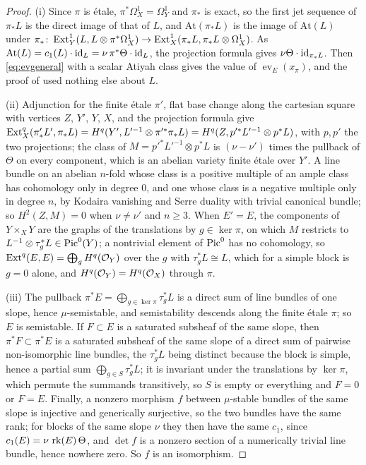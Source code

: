 \begin{proof}
(i) Since $\pi$ is \'etale, $\pi^{*}\Omega^{1}_{X}=\Omega^{1}_{Y}$ and $\pi_{*}$
is exact, so the first jet sequence of $\pi_{*}L$ is the direct image of
that of $L$, and $\mathrm{At}(\pi_{*}L)$ is the image of $\mathrm{At}(L)$
under $\pi_{*}\colon\operatorname{Ext}^{1}_{Y}(L,L\otimes\pi^{*}\Omega^{1}_{X})\to
\operatorname{Ext}^{1}_{X}(\pi_{*}L,\pi_{*}L\otimes\Omega^{1}_{X})$. As $\mathrm{At}(L)=c_{1}(L)\cdot\operatorname{id}_{L}
=\nu\,\pi^{*}\Theta\cdot\operatorname{id}_{L}$, the projection formula gives
$\nu\Theta\cdot\operatorname{id}_{\pi_{*}L}$. Then \eqref{eq:evgeneral} with a scalar Atiyah
class gives the value of $\operatorname{ev}_{E}(x_{\pi})$, and the proof of
 used nothing else about $L$.

(ii) Adjunction for the finite \'etale $\pi'$, flat base change along the
cartesian square with vertices $Z$, $Y'$, $Y$, $X$, and the projection formula
give $\operatorname{Ext}^{q}_{X}(\pi'_{*}L',\pi_{*}L)=H^{q}(Y',L'^{-1}\otimes\pi'^{*}\pi_{*}L)
=H^{q}(Z,p'^{*}L'^{-1}\otimes p^{*}L)$, with $p,p'$ the two projections; the
class of $M=p'^{*}L'^{-1}\otimes p^{*}L$ is $(\nu-\nu')$ times the pullback of
$\Theta$ on every component, which is an abelian variety finite \'etale over
$Y'$. A line bundle on an abelian $n$-fold whose class is a positive
multiple of an ample class has cohomology only in degree $0$, and one whose
class is a negative multiple only in degree $n$, by Kodaira vanishing and
Serre duality with trivial canonical bundle; so $H^{2}(Z,M)=0$ when
$\nu\ne\nu'$ and $n\ge3$. When $E'=E$, the components of $Y\times_{X}Y$ are
the graphs of the translations by $g\in\ker\pi$, on which $M$ restricts to
$L^{-1}\otimes\tau_{g}^{*}L\in\operatorname{Pic}^{0}(Y)$; a nontrivial element of $\operatorname{Pic}^{0}$
has no cohomology, so $\operatorname{Ext}^{q}(E,E)=\bigoplus_{g}H^{q}(\mathcal{O}_{Y})$ over the
$g$ with $\tau_{g}^{*}L\cong L$, which for a simple block is $g=0$ alone, and
$H^{q}(\mathcal{O}_{Y})=H^{q}(\mathcal{O}_{X})$ through $\pi$.

(iii) The pullback $\pi^{*}E=\bigoplus_{g\in\ker\pi}\tau_{g}^{*}L$ is a direct
sum of line bundles of one slope, hence $\mu$-semistable, and semistability
descends along the finite \'etale $\pi$; so $E$ is semistable. If $F\subset E$
is a saturated subsheaf of the same slope, then $\pi^{*}F\subset\pi^{*}E$ is
a saturated subsheaf of the same slope of a direct sum of pairwise
non-isomorphic line bundles, the $\tau_{g}^{*}L$ being distinct because the
block is simple, hence a partial sum $\bigoplus_{g\in S}\tau_{g}^{*}L$; it is
invariant under the translations by $\ker\pi$, which permute the summands
transitively, so $S$ is empty or everything and $F=0$ or $F=E$. Finally, a
nonzero morphism $f$ between $\mu$-stable bundles of the same slope is
injective and generically surjective, so the two bundles have the same rank;
for blocks of the same slope $\nu$ they then have the same $c_{1}$, since
$c_{1}(E)=\nu\,\operatorname{rk}(E)\,\Theta$, and $\det f$ is a nonzero section of a
numerically trivial line bundle, hence nowhere zero. So $f$ is an
isomorphism.
\end{proof}

